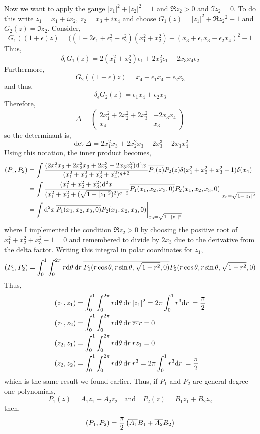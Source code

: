 \documentclass[12pt]{article}
\begin{document}
Now we want to apply the gauge $|z_1|^2 + |z_2|^2 = 1$ and $\Re{z_2} > 0$ and $\Im{z_2} = 0$. To do this write $z_1 = x_1 + i x_2$, $z_2 = x_3 + i x_4$ and choose $G_1(z) = |z_1|^2 + \Re{z_2}^2 - 1$ and $G_2(z) = \Im{z_2}$. Consider,
\[ G_1((1 + \epsilon) z) = ((1 + 2 \epsilon_1 + \epsilon_1^2 + \epsilon_2^2) (x_1^2 + x_2^2) + (x_3 + \epsilon_1 x_3 - \epsilon_2 x_4)^2 - 1 \]
Thus, 
\[ \delta_{\epsilon} G_1(z) = 2 (x_1^2 + x_2^2) \epsilon_1 + 2 x_3^2 \epsilon_1 - 2 x_3 x_4 \epsilon_2 \]
Furthermore,
\[ G_2((1 + \epsilon)z) = x_4 + \epsilon_1 x_4 + \epsilon_2 x_3 \]
and thus,
\[ \delta_{\epsilon} G_2(z) = \epsilon_1 x_4 + \epsilon_2 x_3 \]
Therefore,
\[ \Delta = \begin{pmatrix}
2 x_1^2 + 2 x_2^2 + 2 x_3^2 & - 2 x_3 x_4 
\\
x_4 & x_3 
\end{pmatrix} \]
so the determinant is,
\[ \det{\Delta} = 2 x_1^2 x_3 + 2x_2^2 x_3 + 2 x_3^3 + 2 x_3 x_4^2 \]
Using this notation, the inner product becomes,
\begin{align*}
(P_1, P_2) & = \int \frac{(2 x_1^2 x_3 + 2x_2^2 x_3 + 2 x_3^3 + 2 x_3 x_4^2) \mathrm{d}^{4} x \:}{(x_1^2 + x_2^2 + x_3^2 + x_4^2)^{q + 2}}  \overline{P_1(z)} P_2(z) \delta(x_1^2 + x_2^2 + x_3^2 - 1) \delta(x_4) 
\\
& =  \int \frac{(x_1^2 + x_2^2 + x_3^2 ) \mathrm{d}^{2} x \:}{(x_1^2 + x_2^2 + (\sqrt{1 - |z_1|^2})^2)^{q + 2}}  \overline{P_1(x_1, x_2, x_3, 0)} P_2(x_1, x_2, x_3, 0)  \bigg|_{x_3 = \sqrt{1 - |z_1|^2}}
\\
& = \int \mathrm{d}^{2} x \: \overline{P_1(x_1, x_2, x_3, 0)} P_2(x_1, x_2, x_3, 0) \bigg|_{x_3 = \sqrt{1 - |z_1|^2}}
\end{align*}
where I implemented the condition $\Re{z_2} > 0$ by choosing the positive root of $x_1^2 + x_2^2 + x_3^2 - 1 = 0$ and remembered to divide by $2 x_3$ due to the derivative from the delta factor. Writing this integral in polar coordinates for $z_1$,
\[ (P_1, P_2) = \int_0^1 \int_0^{2 \pi} r \mathrm{d}\theta \: \mathrm{d}r \: \overline{P_1(r \cos{\theta}, r \sin{\theta}, \sqrt{1-r^2}, 0)} P_2(r \cos{\theta}, r \sin{\theta}, \sqrt{1-r^2}, 0) \]
Thus, 
\begin{align*}
(z_1, z_1) & = \int_0^1 \int_0^{2 \pi} r \mathrm{d}\theta \: \mathrm{d}r \: |z_1|^2 = 2\pi \int_0^1 r^3 \mathrm{d}r \: = \frac{\pi}{2}
\\
(z_1, z_2) & = \int_0^1 \int_0^{2 \pi} r \mathrm{d}\theta \: \mathrm{d}r \: \overline{z_1} r  = 0
\\
(z_2, z_1) & = \int_0^1 \int_0^{2 \pi} r \mathrm{d}\theta \: \mathrm{d}r \: r z_1  = 0
\\
(z_2, z_2) & = \int_0^1 \int_0^{2 \pi} r \mathrm{d}\theta \: \mathrm{d}r \: r^3 = 2\pi \int_0^1 r^3 \mathrm{d}r \: = \frac{\pi}{2}
\end{align*}
which is the same result we found earlier. 
Thus, if $P_1$ and $P_2$ are general degree one polynomials,
\[ P_1(z) = A_1 z_1 + A_2 z_2 \quad \text{and} \quad P_2(z) = B_1 z_1 + B_2 z_2 \]
then,
\[ (P_1, P_2) = \frac{\pi}{2} \left( \overline{A_1} B_1 + \overline{A_2} B_2 \right) \]
\end{document}
